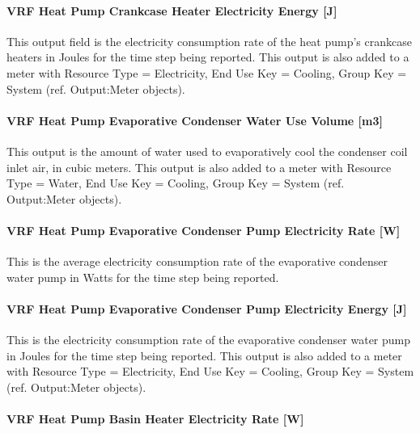 \paragraph{VRF Heat Pump Crankcase Heater Electricity Energy {[}J{]}}\label{vrf-heat-pump-crankcase-heater-electric-energy-j}

This output field is the electricity consumption rate of the heat pump's crankcase heaters in Joules for the time step being reported. This output is also added to a meter with Resource Type = Electricity, End Use Key = Cooling, Group Key = System (ref. Output:Meter objects).

\paragraph{VRF Heat Pump Evaporative Condenser Water Use Volume {[}m3{]}}\label{vrf-heat-pump-evaporative-condenser-water-use-volume-m3}

This output is the amount of water used to evaporatively cool the condenser coil inlet air, in cubic meters. This output is also added to a meter with Resource Type = Water, End Use Key = Cooling, Group Key = System (ref. Output:Meter objects).

\paragraph{VRF Heat Pump Evaporative Condenser Pump Electricity Rate {[}W{]}}\label{vrf-heat-pump-evaporative-condenser-pump-electric-power-w}

This is the average electricity consumption rate of the evaporative condenser water pump in Watts for the time step being reported.

\paragraph{VRF Heat Pump Evaporative Condenser Pump Electricity Energy {[}J{]}}\label{vrf-heat-pump-evaporative-condenser-pump-electric-energy-j}

This is the electricity consumption rate of the evaporative condenser water pump in Joules for the time step being reported. This output is also added to a meter with Resource Type = Electricity, End Use Key = Cooling, Group Key = System (ref. Output:Meter objects).

\paragraph{VRF Heat Pump Basin Heater Electricity Rate {[}W{]}}\label{vrf-heat-pump-basin-heater-electric-power-w}

